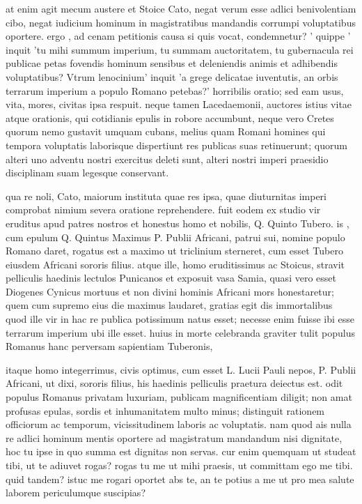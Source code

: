  at enim agit mecum austere et Stoice Cato, negat verum esse adlici benivolentiam cibo, negat iudicium hominum in magistratibus mandandis corrumpi voluptatibus oportere. ergo , ad cenam petitionis causa si quis vocat, condemnetur? ' quippe ' inquit 'tu mihi summum imperium, tu summam auctoritatem, tu gubernacula rei publicae petas fovendis hominum sensibus et deleniendis animis et adhibendis voluptatibus? Vtrum lenocinium' inquit 'a grege delicatae iuventutis, an orbis terrarum imperium a populo Romano petebas?' horribilis oratio; sed eam usus, vita, mores, civitas ipsa respuit. neque tamen Lacedaemonii, auctores istius vitae atque orationis, qui cotidianis epulis in robore accumbunt, neque vero Cretes quorum nemo gustavit umquam cubans, melius quam Romani homines qui tempora voluptatis laborisque dispertiunt res publicas suas retinuerunt; quorum alteri uno adventu nostri exercitus deleti sunt, alteri nostri imperi praesidio disciplinam suam legesque conservant.

 qua re noli, Cato, maiorum instituta quae res ipsa, quae diuturnitas imperi comprobat nimium severa oratione reprehendere. fuit eodem ex studio vir eruditus apud patres nostros et honestus homo et nobilis, Q. Quinto Tubero. is , cum epulum Q. Quintus Maximus P. Publii Africani, patrui sui, nomine populo Romano daret, rogatus est a maximo ut triclinium sterneret, cum esset Tubero eiusdem Africani sororis filius. atque ille, homo eruditissimus ac Stoicus, stravit pelliculis haedinis lectulos Punicanos et exposuit vasa Samia, quasi vero esset Diogenes Cynicus mortuus et non divini hominis Africani mors honestaretur; quem cum supremo eius die maximus laudaret, gratias egit dis immortalibus quod ille vir in hac re publica potissimum natus esset; necesse enim fuisse ibi esse terrarum imperium ubi ille esset. huius in morte celebranda graviter tulit populus Romanus hanc perversam sapientiam Tuberonis,

 itaque homo integerrimus, civis optimus, cum esset L. Lucii Pauli nepos, P. Publii Africani, ut dixi, sororis filius, his haedinis pelliculis praetura deiectus est. odit populus Romanus privatam luxuriam, publicam magnificentiam diligit; non amat profusas epulas, sordis et inhumanitatem multo minus; distinguit rationem officiorum ac temporum, vicissitudinem laboris ac voluptatis. nam quod ais nulla re adlici hominum mentis oportere ad magistratum mandandum nisi dignitate, hoc tu ipse in quo summa est dignitas non servas. cur enim quemquam ut studeat tibi, ut te adiuvet rogas? rogas tu me ut mihi praesis, ut committam ego me tibi. quid tandem? istuc me rogari oportet abs te, an te potius a me ut pro mea salute laborem periculumque suscipias?

